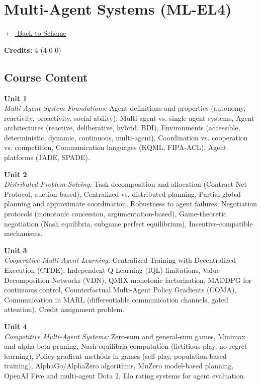 \section*{Multi-Agent Systems (ML-EL4)}
\label{elec:ML_4}

\noindent \small{\hyperref[main:scheme]{$\leftarrow$ Back to Scheme}} \vspace{0.5cm}

\noindent \textbf{Credits:} 4 (4-0-0)

\subsection*{Course Content}
\noindent\textbf{Unit 1} \\
\textit{Multi-Agent System Foundations:} Agent definitions and properties (autonomy, reactivity, proactivity, social ability), Multi-agent vs. single-agent systems, Agent architectures (reactive, deliberative, hybrid, BDI), Environments (accessible, deterministic, dynamic, continuous, multi-agent), Coordination vs. cooperation vs. competition, Communication languages (KQML, FIPA-ACL), Agent platforms (JADE, SPADE).

\vspace{0.3cm}

\noindent\textbf{Unit 2} \\
\textit{Distributed Problem Solving:} Task decomposition and allocation (Contract Net Protocol, auction-based), Centralized vs. distributed planning, Partial global planning and approximate coordination, Robustness to agent failures, Negotiation protocols (monotonic concession, argumentation-based), Game-theoretic negotiation (Nash equilibria, subgame perfect equilibrium), Incentive-compatible mechanisms.

\vspace{0.3cm}

\noindent\textbf{Unit 3} \\
\textit{Cooperative Multi-Agent Learning:} Centralized Training with Decentralized Execution (CTDE), Independent Q-Learning (IQL) limitations, Value Decomposition Networks (VDN), QMIX monotonic factorization, MADDPG for continuous control, Counterfactual Multi-Agent Policy Gradients (COMA), Communication in MARL (differentiable communication channels, gated attention), Credit assignment problem.

\vspace{0.3cm}

\noindent\textbf{Unit 4} \\
\textit{Competitive Multi-Agent Systems:} Zero-sum and general-sum games, Minimax and alpha-beta pruning, Nash equilibria computation (fictitious play, no-regret learning), Policy gradient methods in games (self-play, population-based training), AlphaGo/AlphaZero algorithms, MuZero model-based planning, OpenAI Five and multi-agent Dota 2, Elo rating systems for agent evaluation.

